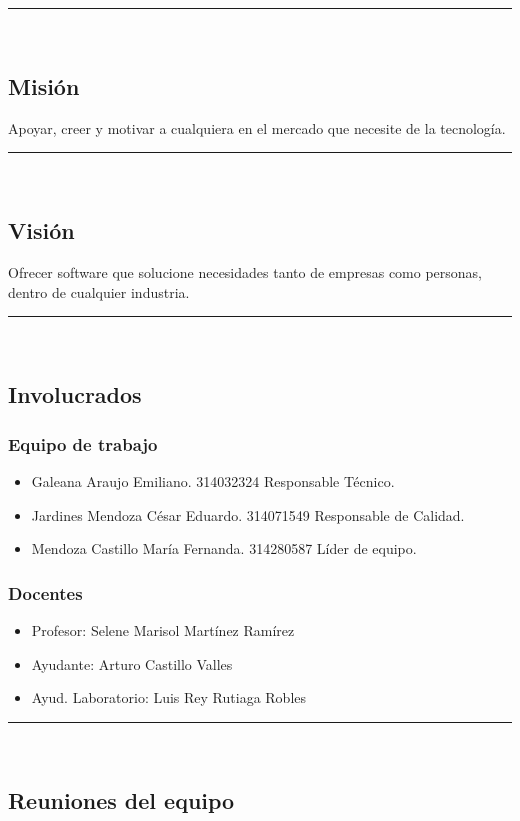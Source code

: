 \documentclass{article}
\begin{document}
\rule{0.8\textwidth}{.8pt}\\

\subsection*{Misión}
Apoyar, creer y motivar a cualquiera en el mercado que necesite de la tecnología.

\rule{0.8\textwidth}{.8pt}\\

\subsection*{Visión}

Ofrecer software que solucione necesidades tanto de empresas como personas,
dentro de cualquier industria.

\rule{0.8\textwidth}{.8pt}\\

\subsection*{Involucrados}
\subsubsection*{Equipo de trabajo}
\begin{itemize}
\item Galeana Araujo Emiliano. 314032324 Responsable Técnico.
\item Jardines Mendoza César Eduardo. 314071549 Responsable de Calidad.
\item Mendoza Castillo María Fernanda. 314280587 Líder de equipo.
\end{itemize}

\subsubsection*{Docentes}
\begin{itemize}
\item Profesor: Selene Marisol Martínez Ramírez
\item Ayudante: Arturo Castillo Valles
\item Ayud. Laboratorio: Luis Rey Rutiaga Robles
\end{itemize}

\rule{0.8\textwidth}{.8pt}\\

\subsection*{Reuniones del equipo}
\end{document}
